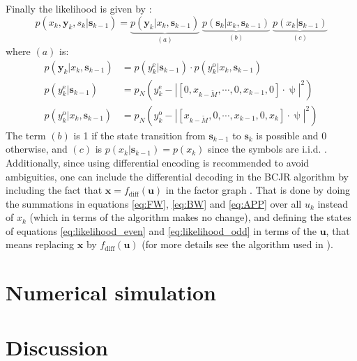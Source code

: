 Finally the likelihood is given by \cite{Plabst_DD}:
\begin{equation}
p(x_k,\bm y_k,s_k|\bm s_{k-1})=\underbrace{p(\bm y_k|x_k,\bm s_{k-1})}_{(a)}\;
\underbrace{p(\bm s_k|x_k,\bm s_{k-1})}_{(b)}\;
\underbrace{p(x_k|\bm s_{k-1})}_{(c)}
\end{equation}
where $(a)$ is:
\begin{align}
	p(\bm y_k|x_k,\bm s_{k-1})&=p(y_k^\text{e}|\bm s_{k-1})\cdot p(y_k^\text{o}|x_k,\bm s_{k-1})\\
	p(y_k^\text{e}|\bm s_{k-1})&=p_N\left(y_k^\text{e}-\left| [0,x_{k-\widetilde{M}},\cdots,0,x_{k-1},0]\cdot\uppsi\right|^2\right)
	\label{eq:likelihood_even}\\
	p(y_k^\text{o}|x_k,\bm s_{k-1})&=p_N\left(y_k^\text{o}-\left| [x_{k-\widetilde{M}},0,\cdots,x_{k-1},0,x_{k}]\cdot\uppsi\right|^2\right)
	\label{eq:likelihood_odd}
\end{align}
The term $(b)$ is 1 if the state transition from $\bm s_{k-1}$ to $\bm s_{k}$ is possible and 0 otherwise, and $(c)$ is $p(x_k|\bm s_{k-1})=p(x_k)$ since the symbols are i.i.d. \cite{Plabst_DD}.\\

Additionally, since using differential encoding is recommended to avoid ambiguities, one can include the differential decoding in the BCJR algorithm by including the fact that $\bm x=f_\text{diff}(\bm u)$ in the factor graph \cite{Plabst_DD}. That is done by doing the summations in equations \ref{eq:FW}, \ref{eq:BW} and \ref{eq:APP} over all $u_k$ instead of $x_k$ (which in terms of the algorithm makes no change), and defining the states of equations \ref{eq:likelihood_even} and \ref{eq:likelihood_odd} in terms of the $\bm u$, that means replacing $\bm x$ by $f_\text{diff}(\bm u)$ (for more details see the algorithm used in \cite{Wang}).  


\section{Numerical simulation}



\section{Discussion}







